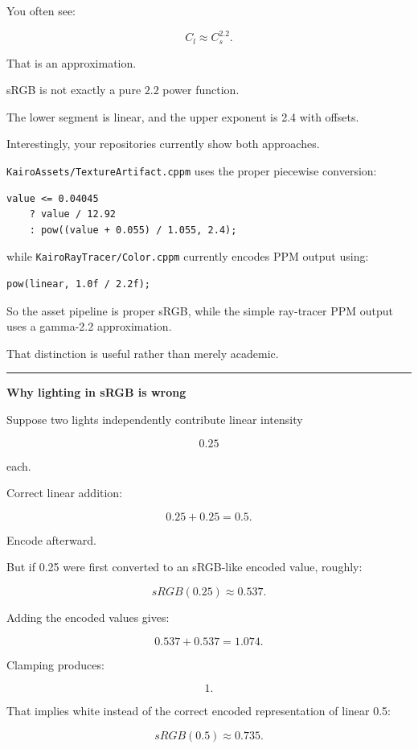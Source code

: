 You often see:

\[
C_l\approx C_s^{2.2}.
\]

That is an approximation.

sRGB is not exactly a pure \(2.2\) power function.

The lower segment is linear, and the upper exponent is 2.4 with offsets.

Interestingly, your repositories currently show both approaches.

\texttt{KairoAssets/TextureArtifact.cppm} uses the proper piecewise conversion:

\begin{verbatim}
value <= 0.04045
    ? value / 12.92
    : pow((value + 0.055) / 1.055, 2.4);
\end{verbatim}

while \texttt{KairoRayTracer/Color.cppm} currently encodes PPM output using:

\begin{verbatim}
pow(linear, 1.0f / 2.2f);
\end{verbatim}

So the asset pipeline is proper sRGB, while the simple ray-tracer PPM output uses a gamma-2.2 approximation.

That distinction is useful rather than merely academic.

\begin{center}\rule{0.5\linewidth}{0.5pt}\end{center}

\textbf{Why lighting in sRGB is wrong}

Suppose two lights independently contribute linear intensity

\[
0.25
\]

each.

Correct linear addition:

\[
0.25+0.25=0.5.
\]

Encode afterward.

But if 0.25 were first converted to an sRGB-like encoded value, roughly:

\[
sRGB(0.25)\approx0.537.
\]

Adding the encoded values gives:

\[
0.537+0.537=1.074.
\]

Clamping produces:

\[
1.
\]

That implies white instead of the correct encoded representation of linear 0.5:

\[
sRGB(0.5)\approx0.735.
\]

